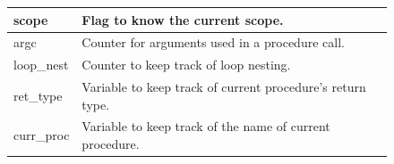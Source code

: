 \begin{figure}[h]
\begin{tabular}{p{1in}p{3in}}
        \midrule scope &
        Flag to know the current scope.\\

        \midrule argc &
        Counter for arguments used in a procedure call.\\

        \midrule loop\_nest &
        Counter to keep track of loop nesting.\\

        \midrule ret\_type &
        Variable to keep track of current procedure's \newline return type.\\

        \midrule curr\_proc &
        Variable to keep track of the name of current \newline procedure.\\

        \bottomrule
    \end{tabular}\\
\end{figure}

